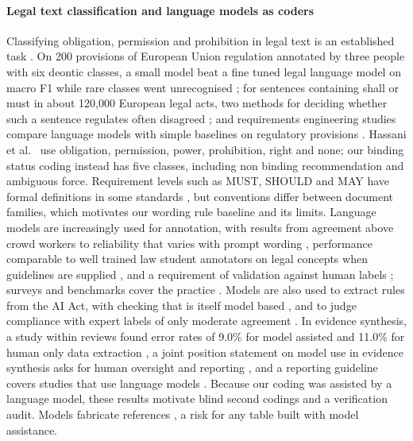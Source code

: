 \documentclass[conference]{IEEEtran}
\begin{document}
\paragraph{Legal text classification and language models as coders} Classifying obligation, permission and prohibition in legal text is an established task \citep{oneill2017classifying,sleimi2020semantic,ariai2024legalsurvey}. On 200 provisions of European Union regulation annotated by three people with six deontic classes, a small model beat a fine tuned legal language model on macro F1 while rare classes went unrecognised \citep{minkova2023lowresource}; for sentences containing shall or must in about 120,000 European legal acts, two methods for deciding whether such a sentence regulates often disagreed \citep{brandsma2025regulatory}; and requirements engineering studies compare language models with simple baselines on regulatory provisions \citep{hassani2025foodsafety}. Hassani et al.~\citep{hassani2025foodsafety} use obligation, permission, power, prohibition, right and none; our binding status coding instead has five classes, including non binding recommendation and ambiguous force. Requirement levels such as MUST, SHOULD and MAY have formal definitions in some standards \citep{bradner1997key}, but conventions differ between document families, which motivates our wording rule baseline and its limits. Language models are increasingly used for annotation, with results from agreement above crowd workers \citep{gilardi2023chatgpt,tornberg2023chatgpt} to reliability that varies with prompt wording \citep{reiss2023testing}, performance comparable to well trained law student annotators on legal concepts when guidelines are supplied \citep{savelka2023can}, and a requirement of validation against human labels \citep{pangakis2023automated}; surveys and benchmarks cover the practice \citep{tan2024large,ziems2024can}. Models are also used to extract rules from the AI Act, with checking that is itself model based \citep{guliani2026dejure}, and to judge compliance with expert labels of only moderate agreement \citep{marino2025airegbench}. In evidence synthesis, a study within reviews found error rates of 9.0\% for model assisted and 11.0\% for human only data extraction \citep{gartlehner2025swar}, a joint position statement on model use in evidence synthesis asks for human oversight and reporting \citep{flemyng2025position}, and a reporting guideline covers studies that use language models \citep{gallifant2024tripodllm}. Because our coding was assisted by a language model, these results motivate blind second codings and a verification audit. Models fabricate references \citep{fabrication2023chatgpt,chelli2024hallucination,athaluri2023exploring,naser2026cite}, a risk for any table built with model assistance.
\end{document}
